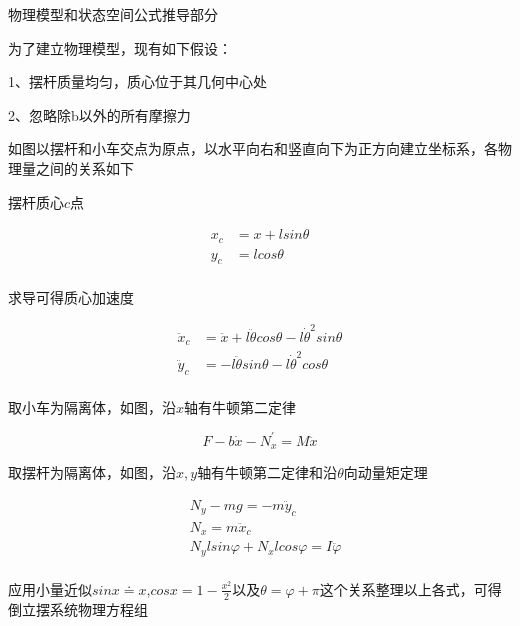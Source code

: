 \documentclass{MathorCupmodeling}
\begin{document}
\begin{center}
{\Large 物理模型和状态空间公式推导部分}

\end{center}
    \newpage

为了建立物理模型，现有如下假设：

1、摆杆质量均匀，质心位于其几何中心处

2、忽略除b以外的所有摩擦力


如图以摆杆和小车交点为原点，以水平向右和竖直向下为正方向建立坐标系，各物理量之间的关系如下

摆杆质心$c$点
	
\begin{equation}
\begin{aligned}
x_c&=x+lsin\theta\\
y_c&=lcos\theta\\
\end{aligned}
\end{equation}

求导可得质心加速度

\begin{equation}
\begin{aligned}
\ddot x_c&=\ddot x+l\ddot{\theta}cos\theta-l\dot{\theta}^2sin\theta\\
\ddot y_c&=-l\ddot{\theta}sin\theta-l\dot{\theta}^2cos\theta\\
\end{aligned}
\end{equation}

取小车为隔离体，如图，沿$x$轴有牛顿第二定律

\begin{equation}
F-b\dot x-N_x^{'}=M\ddot x
\end{equation}

取摆杆为隔离体，如图，沿$x,y$轴有牛顿第二定律和沿$\theta$向动量矩定理

\begin{equation}
\begin{aligned}
&N_y-mg=-m\ddot y_c\\
&N_x=m\ddot x_c\\
&N_ylsin\varphi+N_xlcos\varphi=I\ddot{\varphi}\\
\end{aligned}
\end{equation}

应用小量近似$sinx\doteq x$,$cosx=1-\frac{x^2}{2}$以及$\theta=\varphi+\pi$这个关系整理以上各式，可得倒立摆系统物理方程组
\end{document}
